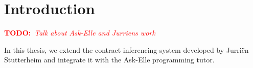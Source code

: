\documentclass[10pt,a4paper]{article}
\newcommand{\annotate}[3]{
	\begin{scriptsize}
	\textcolor{#1}{\textbf{#2}~\textit{#3}}
	\end{scriptsize}\newline}
\newcommand{\todo}[1]{\annotate{red} {TODO:} {#1}}
\begin{document}

\tableofcontents

\section{Introduction}
\todo{Talk about Ask-Elle and Jurriens work}
In this thesis, we extend the contract inferencing system developed by Jurri\"en Stutterheim and integrate it with the Ask-Elle programming tutor.
\end{document}
